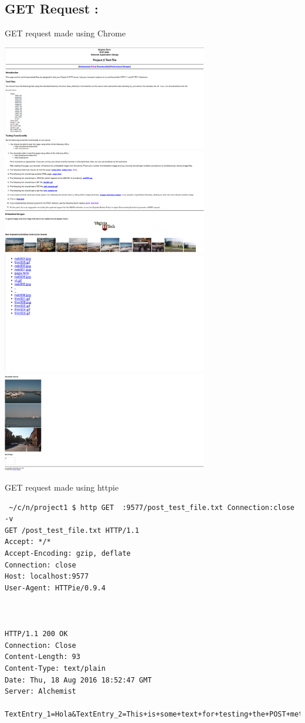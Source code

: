 \documentclass[11pt]{article}
\begin{document}
\subsection{GET Request :}
\label{sec:orgheadline11}
GET request made using Chrome

\includegraphics[width=9cm]{./index1.png}
\includegraphics[width=9cm]{./index2.png} \\
\includegraphics[width=9cm]{./directorylist.png}
\includegraphics[width=9cm]{./index3.png}

\noindent GET request made using httpie
\begin{verbatim}
 ~/c/n/project1 $ http GET  :9577/post_test_file.txt Connection:close -v
GET /post_test_file.txt HTTP/1.1
Accept: */*
Accept-Encoding: gzip, deflate
Connection: close
Host: localhost:9577
User-Agent: HTTPie/0.9.4



HTTP/1.1 200 OK
Connection: Close
Content-Length: 93
Content-Type: text/plain
Date: Thu, 18 Aug 2016 18:52:47 GMT
Server: Alchemist

TextEntry_1=Hola&TextEntry_2=This+is+some+text+for+testing+the+POST+method.%0D%0A&Item=Item_1
\end{verbatim}
\end{document}

